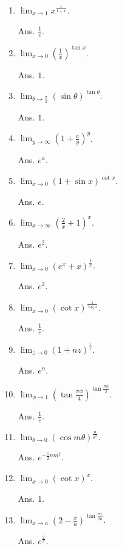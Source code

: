 \begin{enumerate}

\item
$\lim_{x \to 1} x^{\frac{1}{1 - x}}$. 

Ans. $\frac{1}{e}$.

\item
$\lim_{x \to 0} \left( \frac{1}{x} \right)^{\tan x}$. 

Ans. $1$.

\item
$\lim_{\theta \to \frac{\pi}{2}} (\sin \theta)^{\tan \theta}$.

Ans. $1$.

\item
$\lim_{y \to \infty} \left( 1 + \frac{a}{y} \right)^y$.

Ans. $e^a$.

\item
$\lim_{x \to 0} (1 + \sin x)^{\cot x}$. 

Ans. $e$.

\item
$\lim_{x \to \infty} \left( \frac{2}{x} + 1 \right)^x$. 

Ans. $e^2$.

\item
$\lim_{x \to 0} (e^x + x)^{\frac{1}{x}}$. 

Ans. $e^2$.

\item
$\lim_{x \to 0} (\cot x)^{\frac{1}{\log x}}$.

Ans. $\frac{1}{e}$.

\item
$\lim_{z \to 0} (1 + nz)^{\frac{1}{z}}$.

Ans. $e^n$.

\item
$\lim_{\phi \to 1} \left( \tan \frac{\pi \phi}{4} \right)^{\tan \frac{\pi \phi}{2}}$.

Ans. $\frac{1}{e}$.

\item
$\lim_{\theta \to 0} (\cos m\theta)^{\frac{n}{\theta^2}}$. 

Ans. $e^{-\frac{1}{2} nm^2}$.

\item
$\lim_{x \to 0} (\cot x)^x$. 	 

Ans. $1$.

\item
$\lim_{x \to a} \left( 2 -\frac{x}{a} \right)^{\tan \frac{\pi x}{2a}}$.

Ans. $e^{\frac{2}{\pi}}$.


\end{enumerate}
